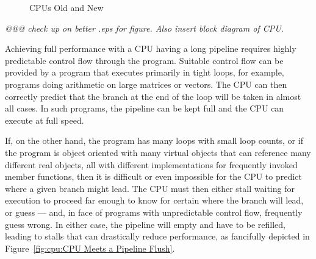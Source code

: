 \begin{figure}[htb]
\begin{center}
\end{center}
\caption{CPUs Old and New}
\label{fig:cpu:CPUs Old and New}
\end{figure}

\emph{@@@ check up on better .eps for figure.  Also insert block diagram
of CPU.}

Achieving full performance with a CPU having a long pipeline requires
highly predictable control flow through the program.
Suitable control flow can be provided by a program that executes primarily
in tight loops, for example, programs doing arithmetic on large matrices
or vectors.
The CPU can then correctly predict that the branch at the end of the loop
will be taken in almost all cases.
In such programs, the pipeline can be kept full and the CPU can execute
at full speed.

If, on the other hand, the program has many loops with small loop counts,
or if the program is object oriented with many virtual objects that
can reference many different real objects, all with different implementations
for frequently invoked member functions, then it is difficult or even
impossible for the CPU to predict where a given branch might lead.
The CPU must then either stall waiting for execution to proceed far enough
to know for certain where the branch will lead, or guess --- and, in
face of programs with unpredictable control flow, frequently guess wrong.
In either case, the pipeline will empty and have to be refilled, leading
to stalls that can drastically reduce performance,
as fancifully depicted in Figure~\ref{fig:cpu:CPU Meets a Pipeline Flush}.

